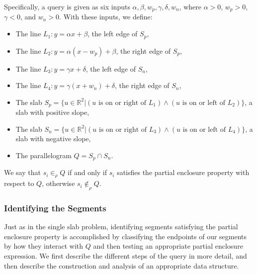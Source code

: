 Specifically, a query is given as six inputs $\alpha, \beta, w_p, \gamma, \delta, w_n$, where $\alpha > 0$, $w_p > 0$, $\gamma < 0$, and $w_n > 0$. With these inputs, we define:

\begin{itemize}
 \item The line $L_1 : y = \alpha x + \beta$, the left edge of $S_p$,

 \item The line $L_2 : y = \alpha (x - w_p) + \beta$, the right edge of $S_p$,

 \item The line $L_3 : y = \gamma x + \delta$, the left edge of $S_n$,

 \item The line $L_4 : y = \gamma (x + w_n) + \delta$, the right edge of $S_n$,

 \item The slab $S_p = \{ u \in \mathbb{R}^2 | (u \text{ is on or right of } L_1) \wedge (u \text{ is on or left of } L_2) \}$, a slab with positive slope,

 \item The slab $S_n = \{ u \in \mathbb{R}^2 | (u \text{ is on or right of } L_3) \wedge (u \text{ is on or left of } L_4) \}$, a slab with negative slope,

 \item The parallelogram $Q = S_p \cap S_n$.

\end{itemize}

We say that $s_i \in_\rho Q$ if and only if $s_i$ satisfies the partial enclosure property with respect to $Q$, otherwise $s_i \not \in_\rho Q$.


\subsubsection{Identifying the Segments}
\label{:slabs:two:approach}

Just as in the single slab problem, identifying segments satisfying the partial enclosure property is accomplished by classifying the endpoints of our segments by how they interact with $Q$ and then testing an appropriate partial enclosure expression. 
We first describe the different steps of the query in more detail, and then describe the construction and analysis of an appropriate data structure.


